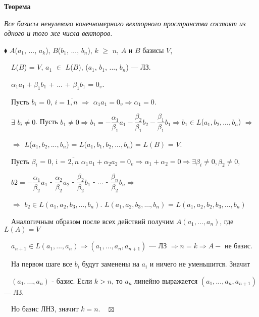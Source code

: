 \documentclass[a4paper, 12pt]{report}
\begin{document}
	\par\bigskip
	\textbf{Теорема}
	
	\textit{Все базисы ненулевого конечномерного векторного пространства состоят из одного и того же числа векторов.}
	
	$\blacklozenge$  $A$($a_1$, ..., $a_k$), $B$($b_1$, ..., $b_n$), $k$ $\geqslant$  $n$, $A$ и $B$ базисы $V$,
	
	$\quad L$($B$) = $V$, $a_1$ $\in$ $L$($B$), ($a_1$, $b_1$, ..., $b_n$) --- ЛЗ.
	
	$\quad\alpha_1a_1 + \beta_1b_1$ + ... + $\beta_1b_1$ = $0_v$.
	
	\par\bigskip
	
	$\quad$Пусть $b_i$ = 0, $i = \overline{1, n}$ $\Rightarrow$ $\alpha_1a_1 = 0_v \Rightarrow \alpha_1 = 0$.
	
	$\quad\exists$ $b_i \neq 0$. Пусть $b_1 \neq 0 \Rightarrow b_1 = - \dfrac{\alpha_1}{\beta_1}a_1 - \dfrac{\beta_2}{\beta_1}b_2 - \dfrac{\beta_1}{\beta_1}b_1 \Rightarrow b_1 \in L$($a_1, b_2, ..., b_n$) $\Rightarrow$
	
	$\quad\Rightarrow$ $L$($a_1, b_2, ..., b_n$) = $L$($a_1, b_1, b_2, ..., b_n$) = $L(B)$ = $V$.
	
	\par\bigskip
	$\quad$Пусть $\beta_i$ = 0, i = $\overline{2, n}$ $\alpha_1a_1 + \alpha_2a_2 = 0_v \Rightarrow \alpha_1 + \alpha_2 = 0 \Rightarrow \exists \beta_i \neq 0, \beta_2 \neq 0,$
	
	$\quad b2 = - \dfrac{\alpha_1}{\beta_2}a_1$ - $\dfrac{\alpha_2}{\beta_2}a_2$ - $\dfrac{\beta_2}{\beta_2}b_1$ - ... - $\dfrac{\beta_n}{\beta_2}b_n \Rightarrow$
	
	$\quad\Rightarrow$ $b_2 \in L(a_1, a_2, b_3, ..., b_n)$. $L(a_1, a_2, b_3, ..., b_n)$ = $L(a_1, a_2, b_2, b_3, ..., b_n)$
	
	\par\bigskip
	$\quad$Аналогичным образом после всех действий получим $A(a_1, ..., a_n)$, где $L(A) = V$
	
	$\quad a_{n+1} \in L(a_1, ..., a_n) \Rightarrow (a_1, ..., a_n, a_{n+1})$ ---  ЛЗ $\Rightarrow n = k \Rightarrow A - $ не базис.
	
	$\quad$На первом шаге все $b_i$ будут заменены на $a_i$ и ничего не уменьшится. Значит 
	
	$\quad (a_1, ..., a_n)$ - базис. Если $k > n$, то $a_n$ линейно выражается $(a_1, ..., a_n, a_{n+1})$ --- ЛЗ.
	
	$\quad$Но базис ЛНЗ, значит $k = n.\quad \boxtimes$
	
\end{document}
